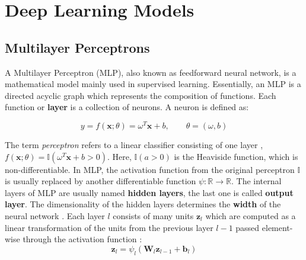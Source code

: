 \section{Deep Learning Models}

\subsection{Multilayer Perceptrons}
A Multilayer Perceptron (MLP), also known as feedforward neural network, is a mathematical model mainly used in supervised learning. Essentially, an MLP is a directed acyclic graph which represents the composition of functions. Each function or \textbf{layer} is a collection of neurons. A neuron is defined as:

\begin{equation}
    \label{eqn:neuron}
    y = f(\mathbf{x}; \theta) = \omega^T \mathbf{x} + b, \qquad \theta = (\omega, b)
\end{equation}

The term \textit{perceptron} refers to a linear classifier consisting of one layer \cite{rosenblatt1958}, $f(\mathbf{x}; \theta) = \mathbb{I}(\omega^T \mathbf{x} + b > 0)$.
Here, $\mathbb{I}(a>0)$ is the Heaviside function, which is non-differentiable. In MLP, the activation function from the original perceptron $\mathbb{I}$ is usually replaced by another differentiable function $\psi \colon \mathbb{R} \to \mathbb{R}$. The internal layers of MLP are usually named \textbf{hidden layers}, the last one is called \textbf{output layer}. The dimensionality of the hidden layers determines the \textbf{width} of the neural network \cite{goodfellow2016}. Each layer $l$ consists of many units $\mathbf{z}_l$ which are computed as a linear transformation of the units from the previous layer $l-1$ passed element-wise through the activation function \cite{murphy2022}:
\begin{equation*}
    \mathbf{z}_l = \psi_l (\mathbf{W}_l \mathbf{z}_{l-1} + \mathbf{b}_l)
\end{equation*}

